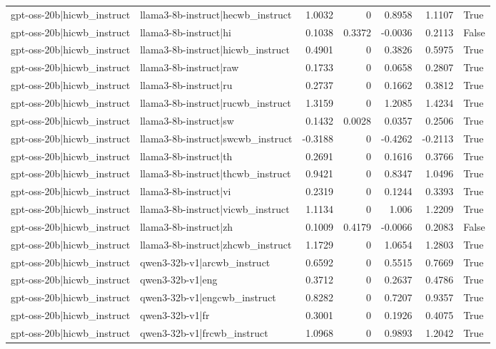 \begin{table}
\begin{tabular}{l l r r r r l}
gpt-oss-20b|hicwb_instruct & llama3-8b-instruct|hecwb_instruct & 1.0032 & 0 & 0.8958 & 1.1107 & True \\
gpt-oss-20b|hicwb_instruct & llama3-8b-instruct|hi & 0.1038 & 0.3372 & -0.0036 & 0.2113 & False \\
gpt-oss-20b|hicwb_instruct & llama3-8b-instruct|hicwb_instruct & 0.4901 & 0 & 0.3826 & 0.5975 & True \\
gpt-oss-20b|hicwb_instruct & llama3-8b-instruct|raw & 0.1733 & 0 & 0.0658 & 0.2807 & True \\
gpt-oss-20b|hicwb_instruct & llama3-8b-instruct|ru & 0.2737 & 0 & 0.1662 & 0.3812 & True \\
gpt-oss-20b|hicwb_instruct & llama3-8b-instruct|rucwb_instruct & 1.3159 & 0 & 1.2085 & 1.4234 & True \\
gpt-oss-20b|hicwb_instruct & llama3-8b-instruct|sw & 0.1432 & 0.0028 & 0.0357 & 0.2506 & True \\
gpt-oss-20b|hicwb_instruct & llama3-8b-instruct|swcwb_instruct & -0.3188 & 0 & -0.4262 & -0.2113 & True \\
gpt-oss-20b|hicwb_instruct & llama3-8b-instruct|th & 0.2691 & 0 & 0.1616 & 0.3766 & True \\
gpt-oss-20b|hicwb_instruct & llama3-8b-instruct|thcwb_instruct & 0.9421 & 0 & 0.8347 & 1.0496 & True \\
gpt-oss-20b|hicwb_instruct & llama3-8b-instruct|vi & 0.2319 & 0 & 0.1244 & 0.3393 & True \\
gpt-oss-20b|hicwb_instruct & llama3-8b-instruct|vicwb_instruct & 1.1134 & 0 & 1.006 & 1.2209 & True \\
gpt-oss-20b|hicwb_instruct & llama3-8b-instruct|zh & 0.1009 & 0.4179 & -0.0066 & 0.2083 & False \\
gpt-oss-20b|hicwb_instruct & llama3-8b-instruct|zhcwb_instruct & 1.1729 & 0 & 1.0654 & 1.2803 & True \\
gpt-oss-20b|hicwb_instruct & qwen3-32b-v1|arcwb_instruct & 0.6592 & 0 & 0.5515 & 0.7669 & True \\
gpt-oss-20b|hicwb_instruct & qwen3-32b-v1|eng & 0.3712 & 0 & 0.2637 & 0.4786 & True \\
gpt-oss-20b|hicwb_instruct & qwen3-32b-v1|engcwb_instruct & 0.8282 & 0 & 0.7207 & 0.9357 & True \\
gpt-oss-20b|hicwb_instruct & qwen3-32b-v1|fr & 0.3001 & 0 & 0.1926 & 0.4075 & True \\
gpt-oss-20b|hicwb_instruct & qwen3-32b-v1|frcwb_instruct & 1.0968 & 0 & 0.9893 & 1.2042 & True \\

\end{tabular}
\end{table}
